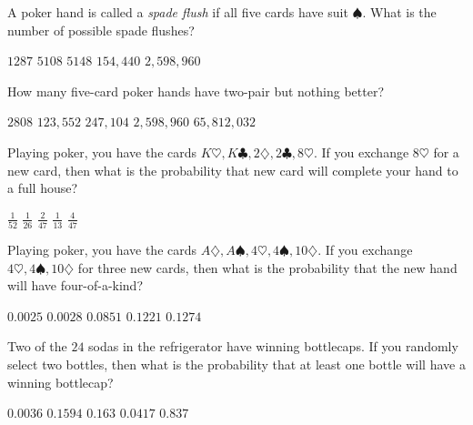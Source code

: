 \documentclass[answers,12pt]{exam}
\begin{document}
\begin{questions}
\question A poker hand is called a {\em spade flush}
if all five cards have suit $\spadesuit$. What is
the number of possible spade flushes?\\
\begin{oneparchoices}
\correctchoice $1287$
\choice $5108$ %
\choice $5148$ %
\choice $154,440$ %
\choice $2,598,960$ %
\end{oneparchoices}

\question 
How many five-card poker hands have two-pair but nothing better?\\
\begin{oneparchoices}
\choice $2808$ %
\correctchoice $123,552$
\choice $247,104$ %
\choice $2,598,960$ %
\choice $65,812,032$ %
\end{oneparchoices}

\question Playing poker, you have the cards
$K\heartsuit,K\clubsuit,2\diamondsuit,2\clubsuit,8\heartsuit$.
If you exchange $8\heartsuit$ for a new card,
then what is the probability that new card
will complete your hand to a full house?\\
\begin{oneparchoices}
\choice $\frac{1}{52}$
\choice $\frac{1}{26}$ %
\choice $\frac{2}{47}$ %
\choice $\frac{1}{13}$ %
\correctchoice $\frac{4}{47}$
\end{oneparchoices}

\question Playing poker, you have the cards
$A\diamondsuit,A\spadesuit,4\heartsuit,4\spadesuit,10\diamondsuit$.
If you exchange $4\heartsuit,4\spadesuit,10\diamondsuit$ for three
new cards, then what is the probability that the new hand
will have four-of-a-kind?\\
\begin{oneparchoices}
\choice $0.0025$ %
\correctchoice $0.0028$
\choice $0.0851$ %
\choice $0.1221$ %
\choice $0.1274$ %
\end{oneparchoices}

\question Two of the $24$ sodas in the refrigerator
have winning bottlecaps. If you randomly select two
bottles, then what is the probability that at least one bottle
will have a winning bottlecap?\\
\begin{oneparchoices}
\choice $0.0036$ %
\choice $0.1594$ %
\correctchoice $0.163$
\choice $0.0417$ %
\choice $0.837$ %
\end{oneparchoices}

\end{questions}
\end{document}

